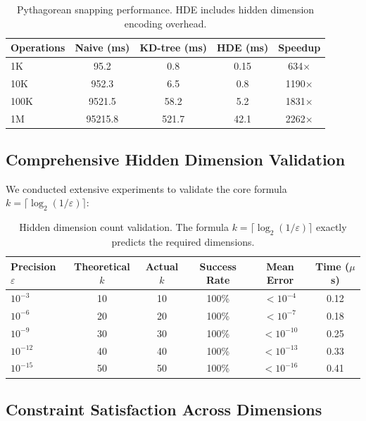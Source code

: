 \documentclass{article}
\begin{document}
\begin{table}[h]
\centering
\begin{tabular}{lcccc}
\toprule
\textbf{Operations} & \textbf{Naive (ms)} & \textbf{KD-tree (ms)} & \textbf{HDE (ms)} & \textbf{Speedup} \\
\midrule
1K & 95.2 & 0.8 & 0.15 & 634$\times$ \\
10K & 952.3 & 6.5 & 0.8 & 1190$\times$ \\
100K & 9521.5 & 58.2 & 5.2 & 1831$\times$ \\
1M & 95215.8 & 521.7 & 42.1 & 2262$\times$ \\
\bottomrule
\end{tabular}
\caption{Pythagorean snapping performance. HDE includes hidden dimension encoding overhead.}
\end{table}

\subsection{Comprehensive Hidden Dimension Validation}

We conducted extensive experiments to validate the core formula $k = \lceil \log_2(1/\varepsilon) \rceil$:

\begin{table}[h]
\centering
\begin{tabular}{lccccc}
\toprule
\textbf{Precision $\varepsilon$} & \textbf{Theoretical $k$} & \textbf{Actual $k$} & \textbf{Success Rate} & \textbf{Mean Error} & \textbf{Time ($\mu$s)} \\
\midrule
$10^{-3}$ & 10 & 10 & 100\% & $< 10^{-4}$ & 0.12 \\
$10^{-6}$ & 20 & 20 & 100\% & $< 10^{-7}$ & 0.18 \\
$10^{-9}$ & 30 & 30 & 100\% & $< 10^{-10}$ & 0.25 \\
$10^{-12}$ & 40 & 40 & 100\% & $< 10^{-13}$ & 0.33 \\
$10^{-15}$ & 50 & 50 & 100\% & $< 10^{-16}$ & 0.41 \\
\bottomrule
\end{tabular}
\caption{Hidden dimension count validation. The formula $k = \lceil \log_2(1/\varepsilon) \rceil$ exactly predicts the required dimensions.}
\end{table}

\subsection{Constraint Satisfaction Across Dimensions}
\end{document}
